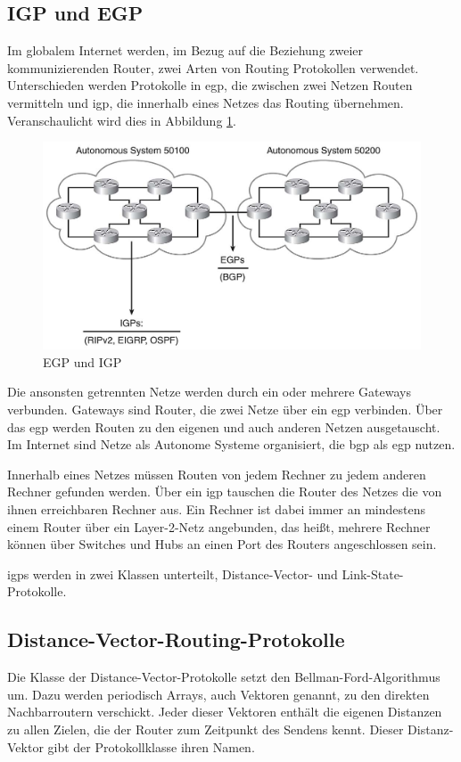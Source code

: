 \documentclass[11pt,a4paper,final]{article}
\begin{document}
\subsection{IGP und EGP}
Im globalem Internet werden, im Bezug auf die Beziehung zweier kommunizierenden Router, zwei Arten von Routing Protokollen verwendet.
Unterschieden werden Protokolle in \ac{egp}, die zwischen zwei Netzen Routen vermitteln und \ac{igp}, die innerhalb eines Netzes das Routing übernehmen.
Veranschaulicht wird dies in Abbildung \ref{igp_egp}.

\begin{figure}[h]
\includegraphics[width=1.0\textwidth]{images/igp_egp.jpg}
\caption[igp egp]{EGP und IGP\footnotemark}
\label{igp_egp}
\end{figure}

Die ansonsten getrennten Netze werden durch ein oder mehrere Gateways verbunden. Gateways sind Router, die zwei Netze über ein \ac{egp} verbinden. Über das \ac{egp} werden Routen zu den eigenen und auch anderen Netzen ausgetauscht. Im Internet sind Netze als Autonome Systeme organisiert, die \ac{bgp} als \ac{egp} nutzen.

Innerhalb eines Netzes müssen Routen von jedem Rechner zu jedem anderen Rechner gefunden werden. Über ein \ac{igp} tauschen die Router des Netzes die von ihnen erreichbaren Rechner aus.
Ein Rechner ist dabei immer an mindestens einem Router über ein Layer-2-Netz angebunden, das heißt, mehrere Rechner können über Switches und Hubs an einen Port des Routers angeschlossen sein.

\ac{igp}s werden in zwei Klassen unterteilt, Distance-Vector- und Link-State-Protokolle.
\subsection{Distance-Vector-Routing-Protokolle}
Die Klasse der Distance-Vector-Protokolle setzt den Bellman-Ford-Algorithmus um. Dazu werden periodisch Arrays, auch Vektoren genannt, zu den direkten Nachbarroutern verschickt. Jeder dieser Vektoren enthält die eigenen Distanzen zu allen Zielen, die der Router zum Zeitpunkt des Sendens kennt. Dieser Distanz-Vektor gibt der Protokollklasse ihren Namen.
\end{document}
